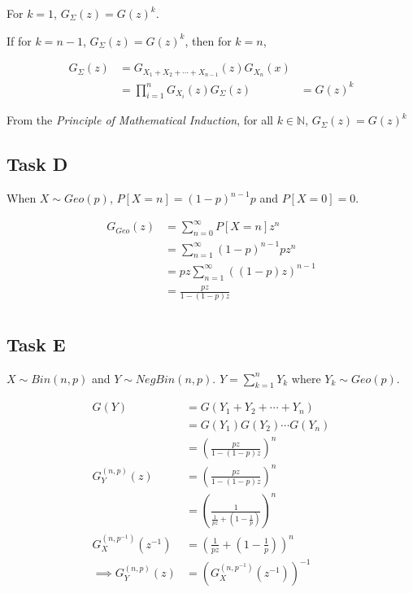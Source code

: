 For $k = 1$, $G_\Sigma(z) = G(z)^k$.

If for $k = n-1$, $G_\Sigma(z) = G(z)^k$, then for $k = n$, 

\begin{align*}
    G_\Sigma(z) &= G_{X_1 + X_2 + \cdots + X_{n-1}}(z)G_{X_n}(x) \\ 
    &= \prod_{i=1}^{n} G_{X_i}(z)
    G_\Sigma(z) &= G(z)^k
\end{align*}

From the \textit{Principle of Mathematical Induction}, for all $k \in \mathbb{N}$, $G_\Sigma(z) = G(z)^k$

\subsection{Task D}

When $X \sim Geo(p)$, $P[X = n] = (1-p)^{n-1}p$ and $P[X = 0] = 0$.

\begin{align*}
    G_{Geo}(z) &= \sum_{n=0}^{\infty} P[X = n]z^n \\
    &= \sum_{n=1}^{\infty} (1-p)^{n-1}pz^n \\
    &= pz \sum_{n=1}^{\infty} ((1-p)z)^{n-1} \\
    &= \frac{pz}{1-(1-p)z} \\
\end{align*}

\subsection{Task E}

$X \sim Bin(n, p)$ and $Y \sim NegBin(n, p)$. $Y = \sum_{k=1}^n Y_k$ where $Y_k \sim Geo(p)$.

\begin{align*}
    G(Y) &= G(Y_1 + Y_2 + \cdots + Y_n) \\
    &= G(Y_1)G(Y_2)\cdots G(Y_n) \\
    &= \left(\frac{pz}{1-(1-p)z}\right)^n \\
    G_Y^{(n, p)}(z) &= \left(\frac{pz}{1-(1-p)z}\right)^n \\
    &= \left(\frac{1}{\frac{1}{pz}+(1-\frac{1}{p})}\right)^n \\
    G_X^{(n, p^{-1})}(z^{-1}) &= \left(\frac{1}{pz}+(1-\frac{1}{p})\right)^n \\
    \implies G_Y^{(n, p)}(z) &= \left(G_X^{(n, p^{-1})}(z^{-1})\right)^{-1}
\end{align*}

